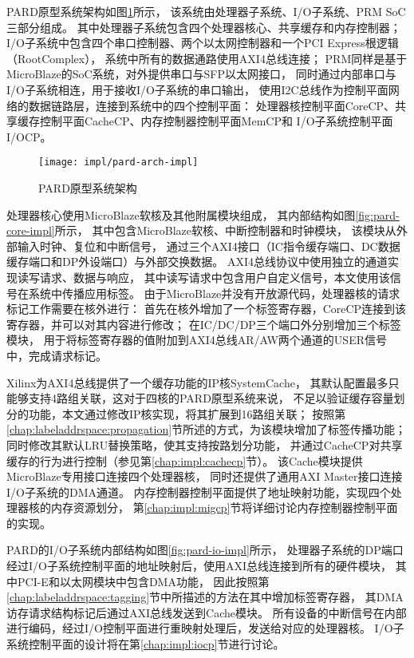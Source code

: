 PARD原型系统架构如图\ref{fig:pard-arch-impl}所示，
该系统由处理器子系统、I/O子系统、PRM SoC三部分组成。
其中处理器子系统包含四个处理器核心、共享缓存和内存控制器；
I/O子系统中包含四个串口控制器、两个以太网控制器和一个PCI Express根逻辑（RootComplex），
系统中所有的数据通路使用AXI4总线连接；
PRM同样是基于MicroBlaze的SoC系统，对外提供串口与SFP以太网接口，
同时通过内部串口与I/O子系统相连，用于接收I/O子系统的串口输出，
使用I2C总线作为控制平面网络的数据链路层，连接到系统中的四个控制平面：
处理器核控制平面CoreCP、共享缓存控制平面CacheCP、内存控制器控制平面MemCP和
I/O子系统控制平面I/OCP。

\begin{figure}[tb]
  \centering
  \texttt{[image: impl/pard-arch-impl]}
  \caption{PARD原型系统架构}
  \label{fig:pard-arch-impl}
\end{figure}

处理器核心使用MicroBlaze软核及其他附属模块组成，
其内部结构如图\ref{fig:pard-core-impl}所示，
其中包含MicroBlaze软核、中断控制器和时钟模块，
该模块从外部输入时钟、复位和中断信号，
通过三个AXI4接口（IC指令缓存端口、DC数据缓存端口和DP外设端口）与外部交换数据。
AXI4总线协议中使用独立的通道实现读写请求、数据与响应，
其中读写请求中包含用户自定义信号，本文使用该信号在系统中传播应用标签。
由于MicroBlaze并没有开放源代码，处理器核的请求标记工作需要在核外进行：
首先在核外增加了一个标签寄存器，CoreCP连接到该寄存器，并可以对其内容进行修改；
在IC/DC/DP三个端口外分别增加三个标签模块，
用于将标签寄存器的值附加到AXI4总线AR/AW两个通道的USER信号中，完成请求标记。

Xilinx为AXI4总线提供了一个缓存功能的IP核SystemCache\cite{pg118-system-cache}，
其默认配置最多只能够支持4路组关联，这对于四核的PARD原型系统来说，
不足以验证缓存容量划分的功能，本文通过修改IP核实现，将其扩展到16路组关联；
按照第\ref{chap:labeladdrspace:propagation}节所述的方式，为该模块增加了标签传播功能；
同时修改其默认LRU替换策略，使其支持按路划分功能，
并通过CacheCP对共享缓存的行为进行控制（参见第\ref{chap:impl:cachecp}节）。
该Cache模块提供MicroBlaze专用接口连接四个处理器核，
同时还提供了通用AXI Master接口连接I/O子系统的DMA通道。
内存控制器控制平面提供了地址映射功能，实现四个处理器核的内存资源划分，
第\ref{chap:impl:migcp}节将详细讨论内存控制器控制平面的实现。

PARD的I/O子系统内部结构如图\ref{fig:pard-io-impl}所示，
处理器子系统的DP端口经过I/O子系统控制平面的地址映射后，使用AXI总线连接到所有的硬件模块，
其中PCI-E和以太网模块中包含DMA功能，
因此按照第\ref{chap:labeladdrspace:tagging}节中所描述的方法在其中增加标签寄存器，
其DMA访存请求结构标记后通过AXI总线发送到Cache模块。
所有设备的中断信号在内部进行编码，经过I/O控制平面进行重映射处理后，发送给对应的处理器核。
I/O子系统控制平面的设计将在第\ref{chap:impl:iocp}节进行讨论。


